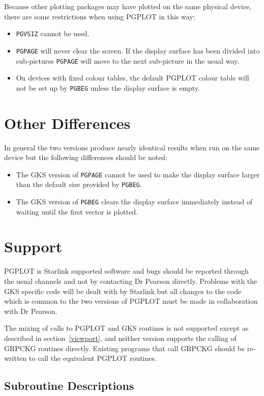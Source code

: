 \documentclass[twoside,11pt]{article}
\newcommand{\hyperref}[4]{#2\ref{#4}#3}
\newcommand{\xref}[3]{#1}
\newcommand{\xlabel}[1]{}
\renewcommand{\_}{\texttt{\symbol{95}}}
\begin{document}
Because other plotting packages may have plotted on the same physical device,
there are some restrictions when using PGPLOT in this way:

\begin{itemize}
\item \xref{\texttt{PGVSIZ}}{sun15}{PGVSIZ} cannot be used.

\item \xref{\texttt{PGPAGE}}{sun15}{PGPAGE} will never clear the
screen.  If the display surface has been divided into sub-pictures
\texttt{PGPAGE} will move to the next sub-picture in the usual way.

\item On devices with fixed colour tables, the default PGPLOT colour
table will not be set up by \xref{\texttt{PGBEG}}{sun15}{PGBEG} unless the
display surface is empty.

\end{itemize}

\section{\xlabel{other_differences}Other Differences}
\label{other_differences}

In general the two versions produce nearly identical results when run on 
the same device but the following differences should be noted:

\begin{itemize}
\item The GKS version of \xref{\texttt{PGPAGE}}{sun15}{PGPAGE} cannot be 
used to make the display surface larger than the default size provided by 
\xref{\texttt{PGBEG}}{sun15}{PGBEG}.
\item The GKS version of \texttt{PGBEG} clears the display surface immediately
instead of waiting until the first vector is plotted.
\end{itemize}

\section{\xlabel{support}Support}
\label{support}

PGPLOT is Starlink supported software and bugs should be reported through the
usual channels and not by contacting Dr Pearson directly. Problems with the GKS
specific code will be dealt with by Starlink but all changes to the code which
is common to the two versions of PGPLOT must be made in collaboration with Dr
Pearson.

The mixing of calls to PGPLOT and GKS routines is not supported except as
described in \hyperref{this section}{section~}{}{viewport}, and neither
version supports the calling of GRPCKG routines directly. Existing programs
that call GRPCKG should be re-written to call the equivalent PGPLOT routines.

\begin{htmlonly}
\appendix
\section{Subroutine Descriptions}

\end{htmlonly}

\end{document}
